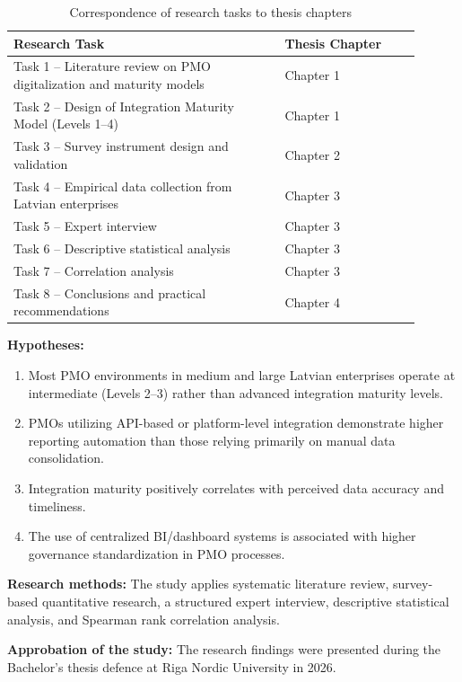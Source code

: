 {\singlespacing
\begin{table}[h]
  \caption{Correspondence of research tasks to thesis chapters}
  \label{tab:task-chapter}
  \centering
  \begin{tabular}{p{0.6\linewidth}p{0.3\linewidth}}
    \toprule
    \textbf{Research Task} & \textbf{Thesis Chapter}\\
    \midrule
    Task 1 -- Literature review on PMO digitalization and maturity models
    & Chapter 1\\
    Task 2 -- Design of Integration Maturity Model (Levels 1--4)
    & Chapter 1\\
    Task 3 -- Survey instrument design and validation
    & Chapter 2\\
    Task 4 -- Empirical data collection from Latvian enterprises
    & Chapter 3\\
    Task 5 -- Expert interview
    & Chapter 3\\
    Task 6 -- Descriptive statistical analysis
    & Chapter 3\\
    Task 7 -- Correlation analysis
    & Chapter 3\\
    Task 8 -- Conclusions and practical recommendations
    & Chapter 4\\
    \bottomrule
  \end{tabular}
\end{table}
}

\textbf{Hypotheses:}
\begin{enumerate}
    \item Most PMO environments in medium and large Latvian enterprises operate at
    intermediate (Levels 2--3) rather than advanced integration maturity levels.
    \item PMOs utilizing API-based or platform-level integration demonstrate higher
    reporting automation than those relying primarily on manual data consolidation.
    \item Integration maturity positively correlates with perceived data accuracy
    and timeliness.
    \item The use of centralized BI/dashboard systems is associated with higher
    governance standardization in PMO processes.
\end{enumerate}

\textbf{Research methods:}
The study applies systematic literature review, survey-based quantitative research,
a structured expert interview, descriptive statistical analysis, and Spearman rank
correlation analysis.

\textbf{Approbation of the study:}
The research findings were presented during the Bachelor's thesis defence at
Riga Nordic University in 2026.
